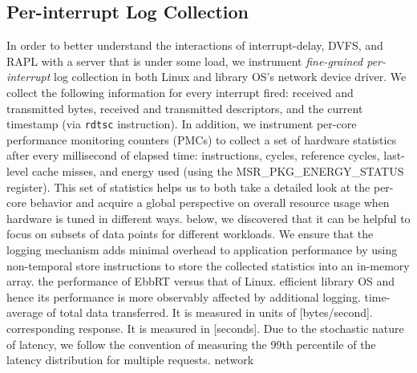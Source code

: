 \subsection{Per-interrupt Log Collection}
\label{sec:log_collect}
In order to better understand the interactions of interrupt-delay, DVFS, and
RAPL with a server that is under some load, we instrument \textit{fine-grained
per-interrupt} log collection in both Linux and library OS's network device
driver.
We collect the following information for every interrupt fired: received and
transmitted bytes, received and transmitted descriptors, and the current
timestamp (via \texttt{rdtsc} instruction).
In addition, we instrument per-core performance monitoring counters (PMCs) to
collect a set of hardware statistics after every millisecond of elapsed time:
instructions, cycles, reference cycles, last-level cache misses, and energy
used (using the MSR\_PKG\_ENERGY\_STATUS register).
This set of statistics helps us to both take a detailed look at the per-core
behavior and acquire a global perspective on overall resource usage when
hardware is tuned in different ways.
below, we discovered that it can be helpful to focus on subsets of data points
for different workloads.
We ensure that the logging mechanism adds minimal overhead to application
performance by using non-temporal store instructions to store the collected
statistics into an in-memory array.
the performance of EbbRT versus that of Linux.
efficient library OS and hence its performance is more observably affected by
additional logging.
time-average of total data transferred. It is measured in units of
[bytes/second].
corresponding response. It is measured in [seconds]. Due to the stochastic
nature of latency, we follow the convention of measuring the 99th percentile of
the latency distribution for multiple requests.
network %
         
